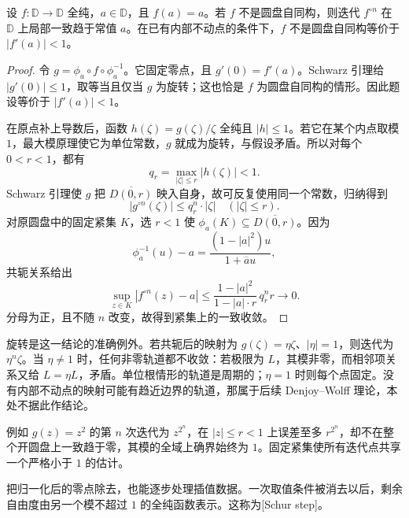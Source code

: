 \begin{proposition}[内点不动点处的迭代]\label{b3:prop:06-interior-iteration}
设 \(f:\mathbb D\rightarrow\mathbb D\) 全纯，\(a\in\mathbb D\)，且 \(f(a)=a\)。若 \(f\) 不是圆盘自同构，则迭代 \(f^{\circ n}\) 在 \(\mathbb D\) 上局部一致趋于常值 \(a\)。在已有内部不动点的条件下，\(f\) 不是圆盘自同构等价于 \(|f'(a)|<1\)。
\end{proposition}
\begin{proof}
令 \(g=\phi_a\circ f\circ\phi_a^{-1}\)。它固定零点，且 \(g'(0)=f'(a)\)。Schwarz 引理给 \(|g'(0)|\le1\)，取等当且仅当 \(g\) 为旋转；这也恰是 \(f\) 为圆盘自同构的情形。因此题设等价于 \(|f'(a)|<1\)。

在原点补上导数后，函数 \(h(\zeta)=g(\zeta)/\zeta\) 全纯且 \(|h|\le1\)。若它在某个内点取模 \(1\)，最大模原理使它为单位常数，\(g\) 就成为旋转，与假设矛盾。所以对每个 \(0<r<1\)，都有
\[
 q_r=\max_{|\zeta|\le r}|h(\zeta)|<1.
\]
Schwarz 引理使 \(g\) 把 \(\overline{D(0,r)}\) 映入自身，故可反复使用同一个常数，归纳得到
\[
 |g^{\circ n}(\zeta)|\le q_r^n\cdot|\zeta|
 \quad(|\zeta|\le r).
\]
对原圆盘中的固定紧集 \(K\)，选 \(r<1\) 使 \(\phi_a(K)\subseteq\overline{D(0,r)}\)。因为
\[
 \phi_a^{-1}(u)-a=\frac{(1-|a|^2)u}{1+\overline a u},
\]
共轭关系给出
\[
 \sup_{z\in K}|f^{\circ n}(z)-a|
 \le\frac{1-|a|^2}{1-|a|\cdot r}\,q_r^n r
 \longrightarrow0.
\]
分母为正，且不随 \(n\) 改变，故得到紧集上的一致收敛。
\end{proof}

旋转是这一结论的准确例外。若共轭后的映射为 \(g(\zeta)=\eta\zeta\)、\(|\eta|=1\)，则迭代为 \(\eta^n\zeta\)。当 \(\eta\ne1\) 时，任何非零轨道都不收敛：若极限为 \(L\)，其模非零，而相邻项关系又给 \(L=\eta L\)，矛盾。单位根情形的轨道是周期的；\(\eta=1\) 时则每个点固定。没有内部不动点的映射可能有趋近边界的轨道，那属于后续 Denjoy--Wolff 理论，本处不据此作结论。

\ProseParagraphBreak

例如 \(g(z)=z^2\) 的第 \(n\) 次迭代为 \(z^{2^n}\)，在 \(|z|\le r<1\) 上误差至多 \(r^{2^n}\)，却不在整个开圆盘上一致趋于零，其模的全域上确界始终为 \(1\)。固定紧集使所有迭代点共享一个严格小于 \(1\) 的估计。

\ProseParagraphBreak

把归一化后的零点除去，也能逐步处理插值数据。一次取值条件被消去以后，剩余自由度由另一个模不超过 \(1\) 的全纯函数表示。这称为[Schur step]。

